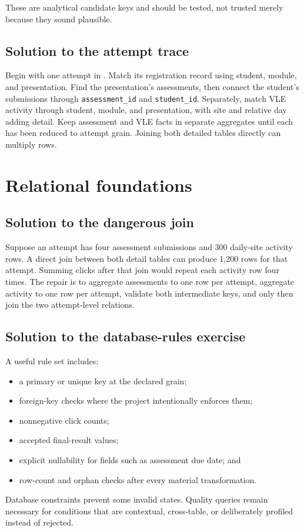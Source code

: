 These are analytical candidate keys and should be tested, not trusted merely
because they sound plausible.

\subsection{Solution to the attempt trace}
\label{sol:attempt-trace}

Begin with one attempt in . Match its registration
record using student, module, and presentation. Find the presentation's
assessments, then connect the student's submissions through
\texttt{assessment\_id} and \texttt{student\_id}. Separately, match VLE activity
through student, module, and presentation, with site and relative day adding
detail. Keep assessment and VLE facts in separate aggregates until each has
been reduced to attempt grain. Joining both detailed tables directly can
multiply rows.

\section{Relational foundations}

\subsection{Solution to the dangerous join}
\label{sol:dangerous-join}

Suppose an attempt has four assessment submissions and 300 daily-site activity
rows. A direct join between both detail tables can produce 1,200 rows for that
attempt. Summing clicks after that join would repeat each activity row four
times. The repair is to aggregate assessments to one row per attempt, aggregate
activity to one row per attempt, validate both intermediate keys, and only then
join the two attempt-level relations.

\subsection{Solution to the database-rules exercise}
\label{sol:database-rules}

A useful rule set includes:
\begin{itemize}
  \item a primary or unique key at the declared grain;
  \item foreign-key checks where the project intentionally enforces them;
  \item nonnegative click counts;
  \item accepted final-result values;
  \item explicit nullability for fields such as assessment due date; and
  \item row-count and orphan checks after every material transformation.
\end{itemize}
Database constraints prevent some invalid states. Quality queries remain
necessary for conditions that are contextual, cross-table, or deliberately
profiled instead of rejected.

